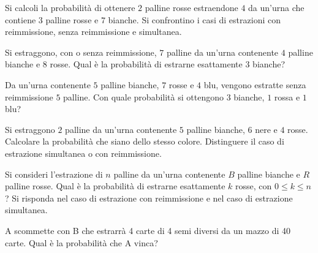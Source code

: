 \Esercizio{}

Si calcoli la probabilità di ottenere $2$ palline rosse estraendone $4$ da un'urna che contiene $3$ palline rosse e $7$ bianche. Si confrontino i casi di estrazioni con reimmissione, senza reimmissione e simultanea.

\Esercizio{}

Si estraggono, con o senza reimmissione, $7$ palline da un'urna contenente $4$ palline bianche e $8$ rosse. Qual è la probabilità di estrarne esattamente $3$ bianche?

\Esercizio{}

Da un'urna contenente $5$ palline bianche, $7$ rosse e $4$ blu, vengono estratte senza reimmissione $5$ palline. Con quale probabilità si ottengono $3$ bianche, $1$ rossa e $1$ blu?

\Esercizio{}

Si estraggono $2$ palline da un'urna contenente $5$ palline bianche, $6$ nere e $4$ rosse. Calcolare la probabilità che siano dello stesso colore. Distinguere il caso di estrazione simultanea o con reimmissione.

\Esercizio{}

Si consideri l'estrazione di $n$ palline da un'urna contenente $B$ palline bianche e $R$ palline rosse. Qual è la probabilità di estrarne esattamente $k$ rosse, con $0\leq k\leq n$? Si risponda nel caso di estrazione con reimmissione e nel caso di estrazione simultanea.

\Esercizio{}

A scommette con B che estrarrà 4 carte di 4 semi diversi da un mazzo di 40 carte. Qual è la probabilità che A vinca?

\Esercizio{}

